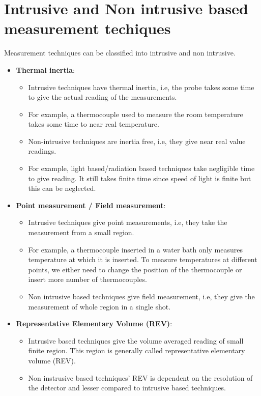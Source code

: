 \documentclass{article}
\begin{document}
\section{Intrusive and Non intrusive based measurement techiques}
Measurement techniques can be classified into intrusive and non intrusive.
\begin{itemize}
	\item \textbf{Thermal inertia}: 
	\begin{itemize}
		\item Intrusive techniques have thermal inertia, i.e, the probe takes some time to give the actual reading of the measurements. 
		\item For example, a thermocouple used to measure the room temperature takes some time to near real temperature.
		\item Non-intrusive techniques are inertia free, i.e, they give near real value readings. 
		\item For example, light based/radiation based techniques take negligible time to give reading. It still takes finite time since speed of light is finite but this can be neglected.
	\end{itemize}

	\item \textbf{Point measurement / Field measurement}:
	\begin{itemize}
		\item Intrusive techniques give point measurements, i.e, they take the measurement from a small region.
		\item For example, a thermocouple inserted in a water bath only measures temperature at which it is inserted. To measure temperatures at different points, we either need to change the position of the thermocouple or insert more number of thermocouples. 
		\item Non intrusive based techniques give field measurement, i.e, they give the measurement of whole region in a single shot.
	\end{itemize}

	\item \textbf{Representative Elementary Volume (REV)}:
	\begin{itemize}
		\item Intrusive based techniques give the volume averaged reading of small finite region. This region is generally called representative elementary volume (REV).
		\item Non instrusive based techniques' REV is dependent on the resolution of the detector and lesser compared to intrusive based techniques.
	\end{itemize}


\end{itemize}
\end{document}

